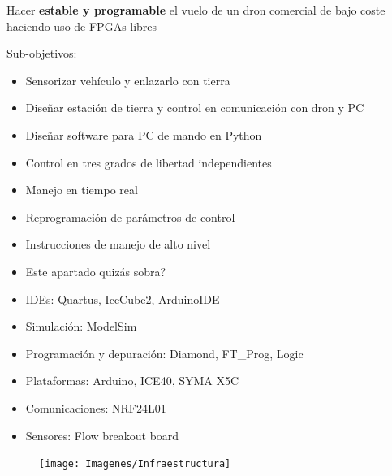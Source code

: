 \documentclass[a4,landscpae]{seminar}
\begin{document}
\begin{hslide}
Hacer \textbf{estable y programable} el vuelo de un dron comercial de
bajo coste haciendo uso de FPGAs libres

Sub-objetivos:
	\begin{itemize}
		\item Sensorizar veh\'iculo y enlazarlo con tierra
		\item Dise\~nar estaci\'on de tierra y control en comunicaci\'on con dron y PC
		\item Dise\~nar software para PC de mando en Python
	\end{itemize}
\end{hslide}
\begin{hslide}
	\begin{itemize}
		\item Control en tres grados de libertad independientes
		\item Manejo en tiempo real
		\item Reprogramaci\'on de par\'ametros de control
		\item Instrucciones de manejo de alto nivel
		\item Este apartado quiz\'as sobra?
	\end{itemize}
\end{hslide}



\begin{hslide}
\begin{minipage}{6.5cm}
	\begin{itemize}
		\item IDEs: Quartus, IceCube2, ArduinoIDE
		\item Simulaci\'on: ModelSim
		\item Programaci\'on y depuraci\'on: Diamond, FT\_Prog, Logic
	\end{itemize}
	\begin{itemize}
		\item Plataformas: Arduino, ICE40, SYMA X5C
		\item Comunicaciones: NRF24L01
		\item Sensores: Flow breakout board

	\end{itemize}
\end{minipage} \hfill
\begin{minipage}{4cm}
	\begin{figure}
		\texttt{[image: Imagenes/Infraestructura]}
	\end{figure}
\end{minipage} \hfill
\end{hslide}
\end{document}
